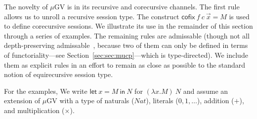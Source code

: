 \documentclass[orivec,envcountsame]{llncs}
\makeatletter
\newcommand{\lto}{\ensuremath{\multimap}}
\newcommand{\uto}{\ensuremath{\rightarrow}}
\newcommand{\mkwd}[1]{\mathsf{#1}}
\newcommand{\lrkwd}{\mkwd{cofix}}
\newcommand{\gvfix}[3]{\lrkwd\:#1\:#2 = #3}
\newcommand{\gvifthen}[3]{\mkwd{if}\:#1\:\mkwd{then}\:#2\:\mkwd{else}\:#3}
\newcommand{\key}{\mkwd}
\newcommand{\mucp}{$\mu\mathrm{CP}$\xspace}
\newcommand{\mugv}{$\mu\mathrm{GV}$\xspace}
\newcommand{\ba}{\begin{array}}
\newcommand{\ea}{\end{array}}
\newcommand{\bl}{\ba[t]{@{}l@{}}}
\newcommand{\el}{\ea}
\newcommand{\secref}[1]{Section~\ref{sec:#1}}
\makeatother
\begin{document}
The novelty of \mugv is in its recursive and corecursive channels. The first rule allows us to
unroll a recursive session type.
%
The construct $\gvfix{f}{c\:\vec{x}}{M}$ is used to define corecursive sessions. We illustrate its
use in the remainder of this section through a series of examples.
%
The remaining rules are admissable (though not all depth-preserving admissable~\cite{TroelstraBook},
because two of them can only be defined in terms of functoriality---see \secref{sec:mucp}---which is
type-directed). We include them as explicit rules in an effort to remain as close as possible to the
standard notion of equirecursive session type.

%



For the examples, We write $\key{let}\:x=M\:\key{in}\:N$ for $(\lambda x.M)\:N$ and assume an
extension of \mugv with a type of naturals ($Nat$), literals ($0,1,\dots$), addition ($+$), and
multiplication ($\times$).

%
\end{document}

